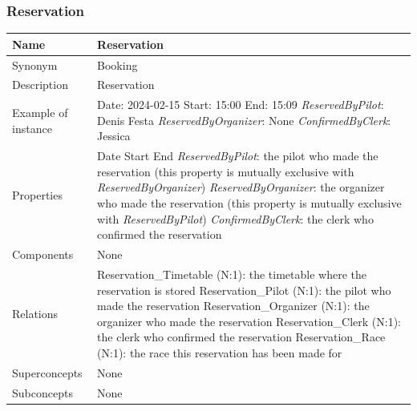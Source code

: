 \documentclass{beamer}
\begin{document}
\begin{frame}
\frametitle{Reservation}
\begin{table}
\tiny
\begin{tabular}{|p{2cm}|p{6cm}|}
\hline
Name & \textbf{Reservation} \\
\hline
Synonym & Booking \\
\hline
Description & Reservation \\
\hline
Example of instance &
Date: 2024-02-15 \newline
Start: 15:00 \newline
End: 15:09 \newline
\textit{ReservedByPilot}: Denis Festa \newline
\textit{ReservedByOrganizer}: None \newline
\textit{ConfirmedByClerk}: Jessica \\
\hline
Properties &
Date \newline
Start \newline
End \newline
\textit{ReservedByPilot}: the pilot who made the reservation (this property 
is mutually exclusive with \textit{ReservedByOrganizer}) \newline
\textit{ReservedByOrganizer}: the organizer who made the reservation (this property
is mutually exclusive with \textit{ReservedByPilot}) \newline
\textit{ConfirmedByClerk}: the clerk who confirmed the reservation \\
\hline
Components & None \\
\hline
Relations &
Reservation\_Timetable (N:1): the timetable where the reservation is stored \newline
Reservation\_Pilot (N:1): the pilot who made the reservation \newline
Reservation\_Organizer (N:1): the organizer who made the reservation \newline
Reservation\_Clerk (N:1): the clerk who confirmed the reservation \newline
Reservation\_Race (N:1): the race this reservation has been made for \\
\hline
Superconcepts & None \\
\hline
Subconcepts & None \\
\hline
\end{tabular}
\end{table}
\end{frame}
\end{document}

